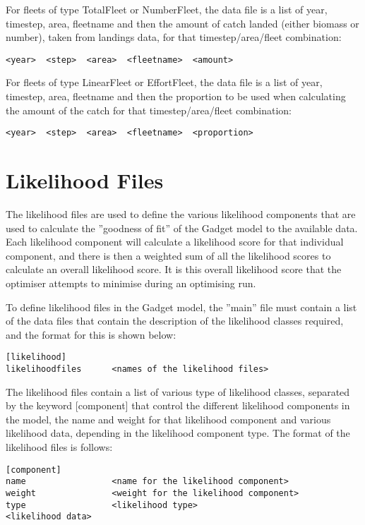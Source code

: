 \documentclass[10pt,twoside]{book}
\begin{document}
For fleets of type TotalFleet or NumberFleet, the data file is a list of year, timestep, area, fleetname and then the amount of catch landed (either biomass or number), taken from landings data, for that timestep/area/fleet combination:

{\small\begin{verbatim}
<year>  <step>  <area>  <fleetname>  <amount>
\end{verbatim}}

For fleets of type LinearFleet or EffortFleet, the data file is a list of year, timestep, area, fleetname and then the proportion to be used when calculating the amount of the catch for that timestep/area/fleet combination:

{\small\begin{verbatim}
<year>  <step>  <area>  <fleetname>  <proportion>
\end{verbatim}}

\chapter{Likelihood Files}\label{chap:like}
The likelihood files are used to define the various likelihood components that are used to calculate the ''goodness of fit'' of the Gadget model to the available data.  Each likelihood component will calculate a likelihood score for that individual component, and there is then a weighted sum of all the likelihood scores to calculate an overall likelihood score.  It is this overall likelihood score that the optimiser attempts to minimise during an optimising run.

\bigskip
To define likelihood files in the Gadget model, the ''main'' file must contain a list of the data files that contain the description of the likelihood classes required, and the format for this is shown below:

{\small\begin{verbatim}
[likelihood]
likelihoodfiles      <names of the likelihood files>
\end{verbatim}}

The likelihood files contain a list of various type of likelihood classes, separated by the keyword [component] that control the different likelihood components in the model, the name and weight for that likelihood component and various likelihood data, depending in the likelihood component type.  The format of the likelihood files is follows:

{\small\begin{verbatim}
[component]
name                 <name for the likelihood component>
weight               <weight for the likelihood component>
type                 <likelihood type>
<likelihood data>
\end{verbatim}}
\end{document}
